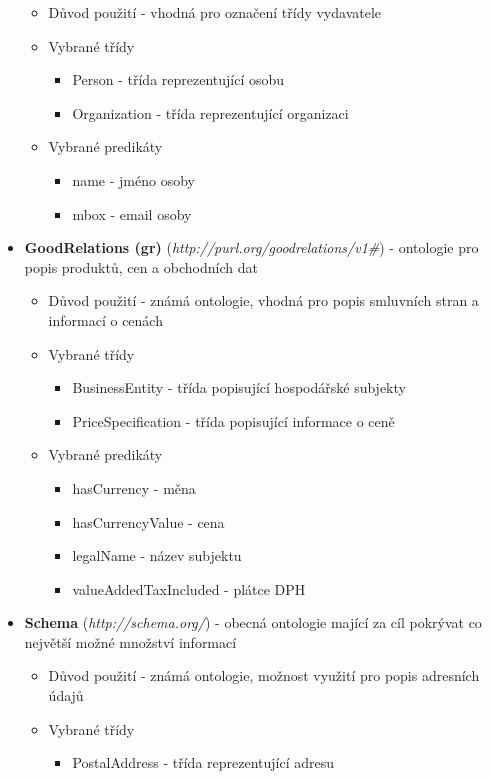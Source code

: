 \begin{itemize}
\begin{itemize}
	\item Důvod použití - vhodná pro označení třídy vydavatele
	\item Vybrané třídy 
		\begin{itemize}
		\item Person - třída reprezentující osobu
		\item Organization - třída reprezentující organizaci 
		\end{itemize}
	\item Vybrané predikáty
		\begin{itemize}
		\item name - jméno osoby
		\item mbox - email osoby
		\end{itemize}
	\end{itemize}
\item \textbf{GoodRelations (gr)} (\textit{http://purl.org/goodrelations/v1\#}) - ontologie pro popis produktů, cen a obchodních dat
	\begin{itemize}
	\item Důvod použití - známá ontologie, vhodná pro popis smluvních stran a informací o cenách 
	\item Vybrané třídy 
		\begin{itemize}
		\item BusinessEntity - třída popisující hospodářské subjekty
		\item PriceSpecification - třída popisující informace o ceně
		\end{itemize}
	\item Vybrané predikáty
		\begin{itemize}
		\item hasCurrency - měna
		\item hasCurrencyValue - cena
		\item legalName - název subjektu
		\item valueAddedTaxIncluded - plátce DPH
		\end{itemize}
	\end{itemize}
\item \textbf{Schema} (\textit{http://schema.org/}) - obecná ontologie mající za cíl pokrývat co největší možné množství informací
	\begin{itemize}
	\item Důvod použití - známá ontologie, možnost využití pro popis adresních údajů 
	\item Vybrané třídy 
		\begin{itemize}
		\item PostalAddress - třída reprezentující adresu 

\end{itemize}
\end{itemize}
\end{itemize}
